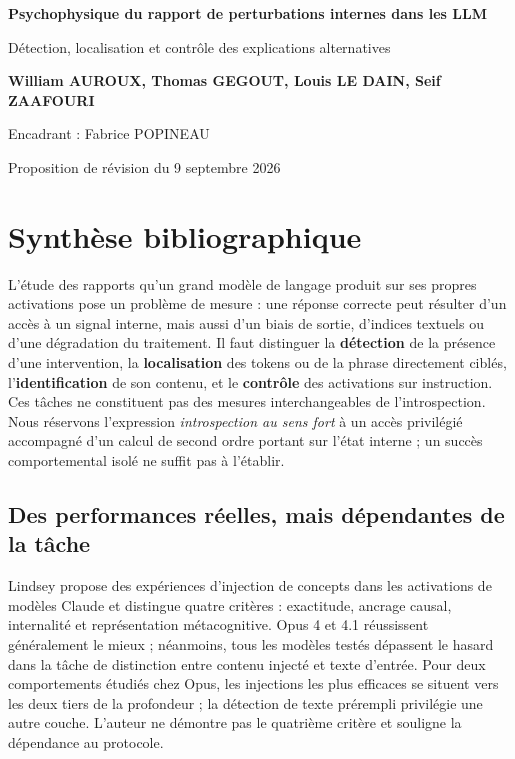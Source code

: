\documentclass[10pt,a4paper]{article}
\begin{document}
\begin{center}
{\LARGE\bfseries Psychophysique du rapport de perturbations internes dans les LLM\par}
\vspace{4pt}
{\large Détection, localisation et contrôle des explications alternatives\par}
\vspace{9pt}
{\normalsize\bfseries William AUROUX, Thomas GEGOUT, Louis LE DAIN, Seif ZAAFOURI\par}
{\small Encadrant : Fabrice POPINEAU\par}
{\small Proposition de révision du 9 septembre 2026\par}
\end{center}

\section*{Synthèse bibliographique}

L'étude des rapports qu'un grand modèle de langage produit sur ses propres activations pose un problème de mesure : une réponse correcte peut résulter d'un accès à un signal interne, mais aussi d'un biais de sortie, d'indices textuels ou d'une dégradation du traitement. Il faut distinguer la \textbf{détection} de la présence d'une intervention, la \textbf{localisation} des tokens ou de la phrase directement ciblés, l'\textbf{identification} de son contenu, et le \textbf{contrôle} des activations sur instruction. Ces tâches ne constituent pas des mesures interchangeables de l'introspection. Nous réservons l'expression \emph{introspection au sens fort} à un accès privilégié accompagné d'un calcul de second ordre portant sur l'état interne ; un succès comportemental isolé ne suffit pas à l'établir.

\subsection*{Des performances réelles, mais dépendantes de la tâche}

Lindsey \cite{lindsey2026} propose des expériences d'injection de concepts dans les activations de modèles Claude et distingue quatre critères : exactitude, ancrage causal, internalité et représentation métacognitive. Opus 4 et 4.1 réussissent généralement le mieux ; néanmoins, tous les modèles testés dépassent le hasard dans la tâche de distinction entre contenu injecté et texte d'entrée. Pour deux comportements étudiés chez Opus, les injections les plus efficaces se situent vers les deux tiers de la profondeur ; la détection de texte prérempli privilégie une autre couche. L'auteur ne démontre pas le quatrième critère et souligne la dépendance au protocole.
\end{document}
